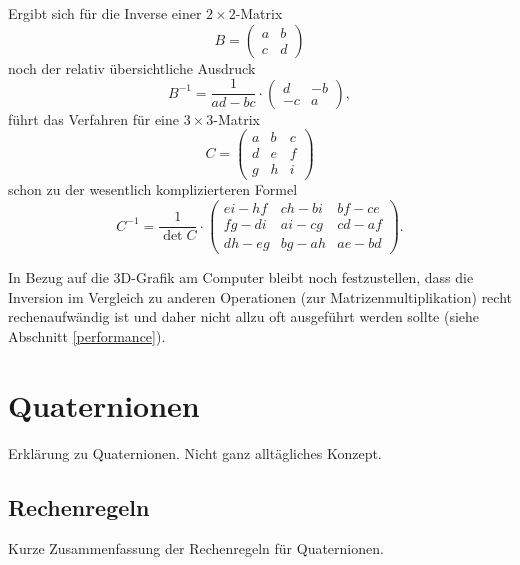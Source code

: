 Ergibt sich für die Inverse einer $2 \times 2$-Matrix
\begin{equation}
 B = \begin{pmatrix}
  a & b \\
  c & d
 \end{pmatrix}
\end{equation}
noch der relativ übersichtliche Ausdruck
\begin{equation}
 B^{-1} = \frac{1}{ad-bc} \cdot
 \begin{pmatrix}
  d & -b \\
  -c & a
 \end{pmatrix},
\end{equation}
führt das Verfahren für eine $3 \times 3$-Matrix
\begin{equation}
 C = \begin{pmatrix}
  a & b & c \\
  d & e & f \\
  g & h & i
 \end{pmatrix}
\end{equation}
schon zu der wesentlich komplizierteren Formel
\begin{equation}
 C^{-1} = \frac{1}{\det C} \cdot
 \begin{pmatrix}
  ei - hf & ch - bi & bf - ce \\
  fg - di & ai - cg & cd - af \\
  dh - eg & bg - ah & ae - bd
 \end{pmatrix}.
\end{equation}

In Bezug auf die 3D-Grafik am Computer bleibt noch festzustellen, dass die Inversion im Vergleich zu anderen Operationen (\zb zur Matrizenmultiplikation) recht rechenaufwändig ist und daher nicht allzu oft ausgeführt werden sollte (siehe Abschnitt \ref{performance}).

\section{Quaternionen}
Erklärung zu Quaternionen. Nicht ganz alltägliches Konzept.

\subsection{Rechenregeln}
Kurze Zusammenfassung der Rechenregeln für Quaternionen.